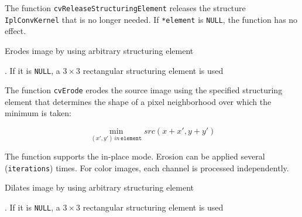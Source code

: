 \begin{description}
\end{description}

The function \texttt{cvReleaseStructuringElement} releases the structure \texttt{IplConvKernel} that is no longer needed. If \texttt{*element} is \texttt{NULL}, the function has no effect.

\label{Erode}

Erodes image by using arbitrary structuring element


\begin{description}
. If it is \texttt{NULL}, a $3\times 3$ rectangular structuring element is used
\end{description}

The function \texttt{cvErode} erodes the source image using the specified structuring element that determines the shape of a pixel neighborhood over which the minimum is taken:

\[
\min_{(x',y') \, in \, \texttt{element}}src(x+x',y+y')
\]

The function supports the in-place mode. Erosion can be applied several (\texttt{iterations}) times. For color images, each channel is processed independently.

\label{Dilate}

Dilates image by using arbitrary structuring element


\begin{description}
. If it is \texttt{NULL}, a $3\times 3$ rectangular structuring element is used
\end{description}

